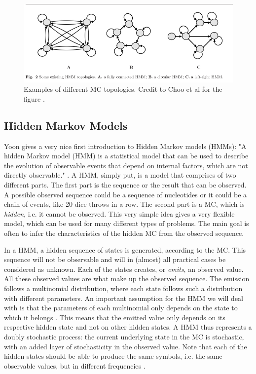 \documentclass{article}\usepackage[]{graphicx}\usepackage[]{color}
\begin{document}
\begin{figure}
    \centering
    \includegraphics[width = \textwidth]{ChooHMMTopologies.png}
    \caption{Examples of different MC topologies. Credit to Choo et al for the figure \cite{Choo2004}.}
    \label{fig:ChooTopologies}
\end{figure}

\subsection{Hidden Markov Models} \label{Section:HiddenMarkovModels}
Yoon gives a very nice first introduction to Hidden Markov models (HMMs): "A hidden Markov model (HMM) is a statistical model that can be used to describe the evolution of observable events that depend on internal factors, which are not directly observable." \cite{Yoon2009}. A HMM, simply put, is a model that comprises of two different parts. The first part is the sequence or the result that can be observed. A possible observed sequence could be a sequence of nucleotides or it could be a chain of events, like 20 dice throws in a row. The second part is a MC, which is \textit{hidden}, i.e. it cannot be observed. This very simple idea gives a very flexible model, which can be used for many different types of problems. The main goal is often to infer the characteristics of the hidden MC from the observed sequence. 

In a HMM, a hidden sequence of states is generated, according to the MC. This sequence will not be observable and will in (almost) all practical cases be considered as unknown. Each of the states creates, or \textit{emits}, an observed value. All these observed values are what make up the observed sequence. The emission follows a multinomial distribution, where each state follows such a distribution with different parameters. An important assumption for the HMM we will deal with is that the parameters of each multinomial only depends on the state to which it belongs \cite{Choo2004}. This means that the emitted value only depends on its respective hidden state and not on other hidden states. A HMM thus represents a doubly stochastic process: the current underlying state in the MC is stochastic, with an added layer of stochasticity in the observed value. Note that each of the hidden states should be able to produce the same symbols, i.e. the same observable values, but in different frequencies \cite{Christianini2006}.
\end{document}
